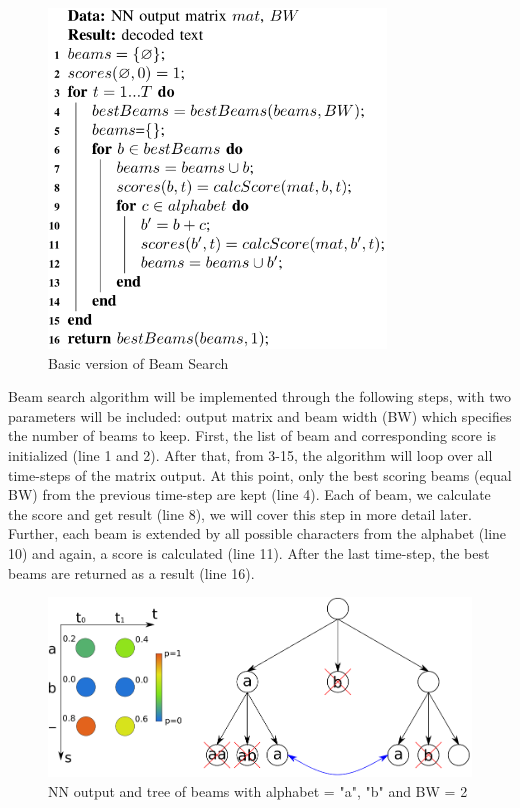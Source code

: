 \begin{figure}[H]
	\centering
	\includegraphics[width=0.8\textwidth]{img/Chap3/Basic-Version-BeamSearch}
	\caption{ Basic version of Beam Search }
	\label{fig:Chap3-Basic-Version-BeamSearch}
\end{figure}


Beam search algorithm will be implemented through the following steps, with two
parameters will be included: output matrix and beam width (BW) which specifies the number
of beams to keep. First, the list of beam and corresponding score is
initialized (line 1 and 2). After that, from 3-15, the algorithm will loop over all time-steps
of the matrix output. At this point, only the best scoring beams (equal BW) from the previous
time-step are kept (line 4). Each of beam, we calculate the score and get result (line 8), we will cover
this step in more detail later. Further, each beam is extended by all possible characters from
the alphabet (line 10) and again, a score is calculated (line 11). After the last time-step,
the best beams are returned as a result (line 16).


\begin{figure}[H]
	\centering
	\includegraphics[width=\textwidth]{img/Chap3/BeamSearchTree}
	\caption{ NN output and tree of beams with alphabet = {"a", "b"} and BW = 2 }
	\label{fig:Chap3-BSTree}
\end{figure}

